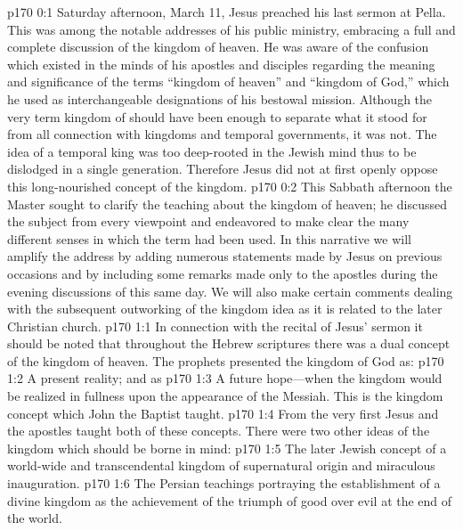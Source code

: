 \author{Midwayer Commission}
\vs p170 0:1 Saturday afternoon, March 11, Jesus preached his last sermon at Pella. This was among the notable addresses of his public ministry, embracing a full and complete discussion of the kingdom of heaven. He was aware of the confusion which existed in the minds of his apostles and disciples regarding the meaning and significance of the terms “kingdom of heaven” and “kingdom of God,” which he used as interchangeable designations of his bestowal mission. Although the very term kingdom of  should have been enough to separate what it stood for from all connection with  kingdoms and temporal governments, it was not. The idea of a temporal king was too deep\hyp{}rooted in the Jewish mind thus to be dislodged in a single generation. Therefore Jesus did not at first openly oppose this long\hyp{}nourished concept of the kingdom.
\vs p170 0:2 This Sabbath afternoon the Master sought to clarify the teaching about the kingdom of heaven; he discussed the subject from every viewpoint and endeavored to make clear the many different senses in which the term had been used. In this narrative we will amplify the address by adding numerous statements made by Jesus on previous occasions and by including some remarks made only to the apostles during the evening discussions of this same day. We will also make certain comments dealing with the subsequent outworking of the kingdom idea as it is related to the later Christian church.
\vs p170 1:1 In connection with the recital of Jesus’ sermon it should be noted that throughout the Hebrew scriptures there was a dual concept of the kingdom of heaven. The prophets presented the kingdom of God as:
\pc \vs p170 1:2 \bibnobreakspace A present reality; and as
\pc \vs p170 1:3 \bibnobreakspace A future hope---when the kingdom would be realized in fullness upon the appearance of the Messiah. This is the kingdom concept which John the Baptist taught.
\vs p170 1:4 From the very first Jesus and the apostles taught both of these concepts. There were two other ideas of the kingdom which should be borne in mind:
\pc \vs p170 1:5 \bibnobreakspace The later Jewish concept of a world\hyp{}wide and transcendental kingdom of supernatural origin and miraculous inauguration.
\pc \vs p170 1:6 \bibnobreakspace The Persian teachings portraying the establishment of a divine kingdom as the achievement of the triumph of good over evil at the end of the world.
